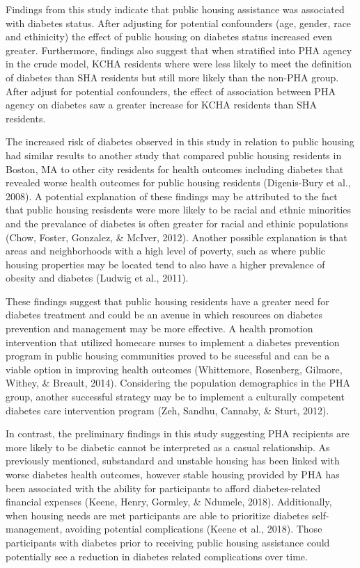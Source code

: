 \documentclass [11pt, proquest] {uwthesis}[2015/03/03]
\begin{document}
Findings from this study indicate that public housing assistance was
associated with diabetes status. After adjusting for potential
confounders (age, gender, race and ethinicity) the effect of public
housing on diabetes status increased even greater. Furthermore, findings
also suggest that when stratified into PHA agency in the crude model,
KCHA residents where were less likely to meet the definition of diabetes
than SHA residents but still more likely than the non-PHA group. After
adjust for potential confounders, the effect of association between PHA
agency on diabetes saw a greater increase for KCHA residents than SHA
residents.

The increased risk of diabetes observed in this study in relation to
public housing had similar results to another study that compared public
housing residents in Boston, MA to other city residents for health
outcomes including diabetes that revealed worse health outcomes for
public housing residents (Digenis-Bury et al., 2008). A potential
explanation of these findings may be attributed to the fact that public
housing resisdents were more likely to be racial and ethnic minorities
and the prevalance of diabetes is often greater for racial and ethinic
populations (Chow, Foster, Gonzalez, \& McIver, 2012). Another possible
explanation is that areas and neighborhoods with a high level of
poverty, such as where public housing properties may be located tend to
also have a higher prevalence of obesity and diabetes (Ludwig et al.,
2011).

These findings suggest that public housing residents have a greater need
for diabetes treatment and could be an avenue in which resources on
diabetes prevention and management may be more effective. A health
promotion intervention that utilized homecare nurses to implement a
diabetes prevention program in public housing communities proved to be
sucessful and can be a viable option in improving health outcomes
(Whittemore, Rosenberg, Gilmore, Withey, \& Breault, 2014). Considering
the population demographics in the PHA group, another successful
strategy may be to implement a culturally competent diabetes care
intervention program (Zeh, Sandhu, Cannaby, \& Sturt, 2012).

In contrast, the preliminary findings in this study suggesting PHA
recipients are more likely to be diabetic cannot be interpreted as a
casual relationship. As previously mentioned, substandard and unstable
housing has been linked with worse diabetes health outcomes, however
stable housing provided by PHA has been associated with the ability for
participants to afford diabetes-related financial expenses (Keene,
Henry, Gormley, \& Ndumele, 2018). Additionally, when housing needs are
met participants are able to prioritize diabetes self-management,
avoiding potential complications (Keene et al., 2018). Those
participants with diabetes prior to receiving public housing assistance
could potentially see a reduction in diabetes related complications over
time.
\end{document}
